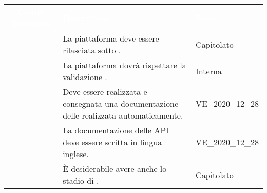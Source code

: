 \renewcommand{\arraystretch}{1.5}
\begin{longtable}{|c C{9.5cm} C{2.5cm}|} 
	
	\textcolor{white}{\textbf{Codice Requisito}}&
	\textcolor{white}{\textbf{Descrizione}}&
	\textcolor{white}{\textbf{Fonte}}\\

	 & La piattaforma deve essere rilasciata sotto . & Capitolato  \\

	 & La piattaforma dovrà rispettare la validazione . & Interna \\
	
	 & Deve essere realizzata e consegnata una documentazione delle  realizzata automaticamente. & VE\_2020\_12\_28 \\
	
	 & La documentazione delle API deve essere scritta in lingua inglese. & VE\_2020\_12\_28 \\
	
	 & È desiderabile avere anche lo stadio di . & Capitolato \\
	
\end{longtable}

